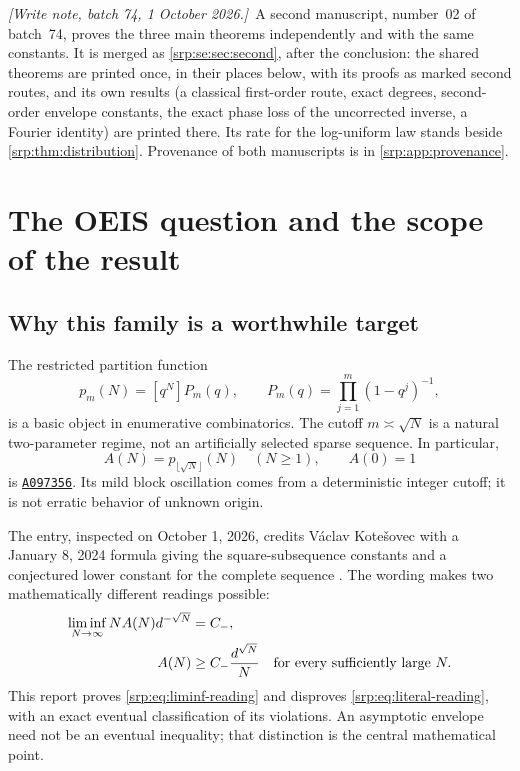 \documentclass[11pt,a4paper]{article}
\numberwithin{equation}{section}
\theoremstyle{definition}
\theoremstyle{remark}
\newcommand{\oeis}[1]{\href{https://oeis.org/#1}{\texttt{#1}}}
\newcommand{\writenotefour}[1]{\par\smallskip\noindent
 \textit{[Write note, batch 74, 1 October 2026.]}\ #1\par\smallskip}
\begin{document}
\writenotefour{A second manuscript, number~02 of batch~74, proves the
three main theorems independently and with the same constants. It is
merged as \cref{srp:se:sec:second}, after the conclusion: the shared
theorems are printed once, in their places below, with its proofs as
marked second routes, and its own results (a classical first-order route,
exact degrees, second-order envelope constants, the exact phase loss of
the uncorrected inverse, a Fourier identity) are printed there. Its rate
for the log-uniform law stands beside \cref{srp:thm:distribution}.
Provenance of both manuscripts is in \cref{srp:app:provenance}.}

\newpage
\tableofcontents
\newpage

\section{The OEIS question and the scope of the result}
\label{srp:sec:scope}

\subsection{Why this family is a worthwhile target}
The restricted partition function
\begin{equation}
 p_m(N)=[q^N]P_m(q),\qquad
 P_m(q)=\prod_{j=1}^m(1-q^j)^{-1},
 \label{srp:eq:definition}
\end{equation}
is a basic object in enumerative combinatorics. The cutoff $m\asymp\sqrt N$
is a natural two-parameter regime, not an artificially selected sparse
sequence. In particular,
\begin{equation}
 A(N)=p_{\lfloor\sqrt N\rfloor}(N)\quad(N\ge1),\qquad A(0)=1
 \label{srp:eq:A}
\end{equation}
is \oeis{A097356}. Its mild block oscillation comes from a deterministic
integer cutoff; it is not erratic behavior of unknown origin.

The entry, inspected on October 1, 2026, credits V\'aclav Kote\v{s}ovec with a
January 8, 2024 formula giving the square-subsequence constants and a
conjectured lower constant for the complete sequence \cite{oeisA}. The
wording makes two mathematically different readings possible:
\begin{align}
 \liminf_{N\to\infty}N A(N)d^{-\sqrt N}&=C_-,
 \label{srp:eq:liminf-reading}\\
 A(N)&\ge C_-\frac{d^{\sqrt N}}{N}
 \quad\hbox{for every sufficiently large }N.
 \label{srp:eq:literal-reading}
\end{align}
This report proves \eqref{srp:eq:liminf-reading} and disproves
\eqref{srp:eq:literal-reading}, with an exact eventual classification of its
violations. An asymptotic envelope need not be an eventual inequality;
that distinction is the central mathematical point.
\end{document}
